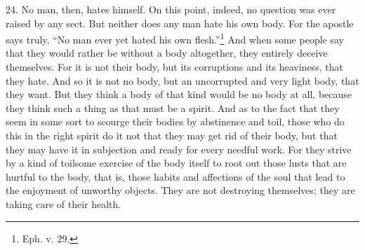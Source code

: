 24. No man, then, hates himself. On this point, indeed, no question was ever raised by any sect. But neither does any man hate his own body. For the apostle says truly, “No man ever yet hated his own flesh.”\footnote{Eph. v. 29.} And when some people say that they would rather be without a body altogether, they entirely deceive themselves. For it is not their body, but its corruptions and its heaviness, that they hate. And so it is not no body, but an uncorrupted and very light body, that they want. But they think a body of that kind would be no body at all, because they think such a thing as that must be a spirit. And as to the fact that they seem in some sort to scourge their bodies by abstinence and toil, those who do this in the right spirit do it not that they may get rid of their body, but that they may have it in subjection and ready for every needful work. For they strive by a kind of toilsome exercise of the body itself to root out those lusts that are hurtful to the body, that is, those habits and affections of the soul that lead to the enjoyment of unworthy objects. They are not destroying themselves; they are taking care of their health.

